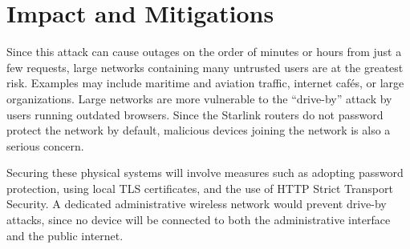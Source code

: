 \section{Impact and Mitigations}\label{sec:impact}

Since this attack can cause outages on the order of minutes or hours from just a few requests, large networks containing many untrusted users are at the greatest risk.
Examples may include maritime and aviation traffic, internet cafés, or large organizations.
Large networks are more vulnerable to the ``drive-by'' attack by users running outdated browsers.
Since the Starlink routers do not password protect the network by default, malicious devices joining the network is also a serious concern.

Securing these physical systems will involve measures such as adopting password protection, using local TLS certificates, and the use of HTTP Strict Transport Security.
A dedicated administrative wireless network would prevent drive-by attacks, since no device will be connected to both the administrative interface and the public internet.
